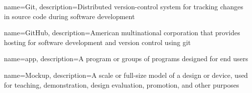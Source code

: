 
{
	name=Git,
	description={Distributed version-control system for tracking changes in source code
	during software development}
}

{
	name=GitHub,
	description={American multinational corporation that provides hosting for software
	development and version control using \gls{git}}
}

{
	name=app,
	description={A program or groups of programs designed for end users}
}

{
	name=Mockup,
	description={A scale or full-size model of a design or device, used for teaching,
	demonstration, design evaluation, promotion, and other purposes}
}